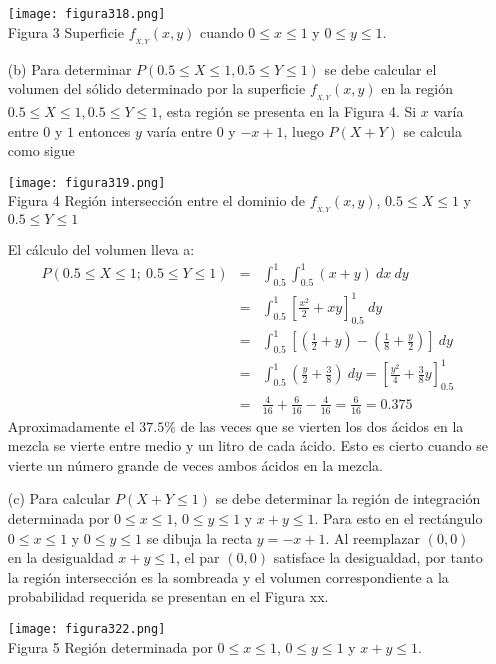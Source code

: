 \documentclass[base=hide,12pt]{elegantbook}
\begin{document}
\begin{itemize}
		\begin{center}
			\texttt{[image: figura318.png]} \\
Figura 3 Superficie $f_{_{X,Y}}(x,y)$ cuando $0\leq x\leq 1$ y $0\leq y\leq 1$.
		\end{center}
%
%	
\item[(b)] Para determinar $P(0.5 \leq X \leq 1, 0.5 \leq Y \leq 1)$ se debe calcular el volumen del sólido determinado por la superficie $f_{_{X,Y}}(x,y)$ en la región $0.5 \leq X \leq 1, 0.5 \leq Y \leq 1$, esta región se presenta en la Figura 4. Si $x$ varía entre $0$ y $1$ entonces $y$ varía entre $0$ y $-x+1$, luego $P(X+Y)$ se calcula como sigue
%		
\begin{center}
\texttt{[image: figura319.png]}\\
Figura 4 Región intersección entre el dominio de $f_{_{X,Y}}(x,y)$, $0.5 \leq X \leq 1$ y $ 0.5 \leq Y \leq 1$
\end{center}
%
	El cálculo del volumen lleva a: 
	\begin{eqnarray*}
		P(0.5\leq X\leq 1; \:0.5\leq Y\leq 1)&=&\int_{0.5}^{1}\int_{0.5}^{1}(x+y)\:dx\:dy\\
		&=&\int_{0.5}^{1}\left[\frac{x^2}{2}+xy\right]_{0.5}^{1}\:dy\\
		&=&\int_{0.5}^{1}\left[\left(\frac{1}{2}+y\right)-\left(\frac{1}{8}+\frac{y}{2}\right)\right]\:dy\\
		&=&\int_{0.5}^{1}\left(\frac{y}{2}+\frac{3}{8}\right)\:dy=\left[\frac{y^2}{4}+\frac{3}{8}y\right]_{0.5}^{1}\\
		&=&\frac{4}{16}+\frac{6}{16}-\frac{4}{16}=\frac{6}{16}=0.375
	\end{eqnarray*}
	Aproximadamente el $37.5\%$ de las veces que se vierten los dos ácidos en la mezcla se vierte entre medio y un litro de cada ácido. Esto es cierto cuando se vierte un número grande de veces ambos ácidos en la mezcla.\\
	\item[(c)] Para calcular $P(X+Y\leq 1)$ se debe determinar la región de integración determinada por $0\leq x\leq 1$, $0\leq y\leq 1$ y $x+y\leq 1$. Para esto en el rectángulo $0\leq x\leq 1$ y $0\leq y\leq 1$ se dibuja la recta $y=-x+1$. Al reemplazar $(0,0)$ en la desigualdad $x+y\leq 1$, el par $(0,0)$ satisface la desigualdad, por tanto la región intersección es la sombreada y el volumen correspondiente a la probabilidad requerida se presentan en el Figura xx.

\begin{center}
\texttt{[image: figura322.png]} \\
Figura 5 Región determinada por $0 \leq x \leq 1$, $0 \leq y \leq 1$ y $x + y \leq 1$.
\end{center}	


\end{itemize}
\end{document}
